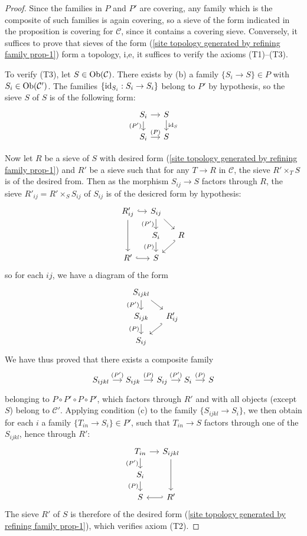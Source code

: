 \begin{proof}
Since the families in $P$ and $P'$ are covering, any family which is the composite of such families is again covering, so a sieve of the form indicated in the proposition is covering for $\mathcal{C}$, since it contains a covering sieve. Conversely, it suffices to prove that sieves of the form (\ref{site topology generated by refining family prop-1}) form a topology, i,e, it suffices to verify the axioms (T1)--(T3).\par
To verify (T3), let $S\in\mathrm{Ob}(\mathcal{C})$. There exists by (b) a family $\{S_i\to S\}\in P$ with $S_i\in\mathrm{Ob}(\mathcal{C}')$. The families $\{\operatorname{id}_{S_i}:S_i\to S_i\}$ belong to $P'$ by hypothesis, so the sieve $S$ of $S$ is of the following form:
\[\begin{tikzcd}[row sep=4mm, column sep=4mm]
S_i\ar[r]\ar[d,swap,"(P')"]&S\ar[d,"\id_S"]\\
S_i\ar[r,"(P)"]&S
\end{tikzcd}\]

Now let $R$ be a sieve of $S$ with desired form (\ref{site topology generated by refining family prop-1}) and $R'$ be a sieve such that for any $T\to R$ in $\mathcal{C}$, the sieve $R'\times_TS$ is of the desired from. Then as the morphism $S_{ij}\to S$ factors through $R$, the sieve $R'_{ij}=R'\times_SS_{ij}$ of $S_{ij}$ is of the desicred form by hypothesis:
\[\begin{tikzcd}[row sep=4mm, column sep=4mm]
R'_{ij}\ar[dd]\ar[r,hook]&S_{ij}\ar[d,swap,"(P')"]\ar[rd]&\\
&S_i\ar[d,swap,"(P)"]&R\ar[ld,hook']\\
R'\ar[r,hook]&S&
\end{tikzcd}\]
so for each $ij$, we have a diagram of the form
\[\begin{tikzcd}[row sep=4mm, column sep=4mm]
S_{ijkl}\ar[rd]\ar[d,swap,"(P')"]&\\
S_{ijk}\ar[d,swap,"(P)"]&R'_{ij}\ar[ld,hook']\\
S_{ij}
\end{tikzcd}\]
We have thus proved that there exists a composite family
\[\begin{tikzcd}[row sep=4mm, column sep=4mm]
S_{ijkl}\ar[r,"(P')"]&S_{ijk}\ar[r,"(P)"]&S_{ij}\ar[r,"(P')"]&S_i\ar[r,"(P)"]&S
\end{tikzcd}\]
belonging to $P\circ P'\circ P\circ P'$, which factors through $R'$ and with all objects (except $S$) belong to $\mathcal{C}'$. Applying condition (c) to the family $\{S_{ijkl}\to S_i\}$, we then obtain for each $i$ a family $\{T_{in}\to S_i\}\in P'$, such that $T_{in}\to S$ factors through one of the $S_{ijkl}$, hence through $R'$:
\[\begin{tikzcd}[row sep=4mm, column sep=4mm]
T_{in}\ar[r]\ar[d,swap,"(P')"]&S_{ijkl}\ar[dd]\\
S_i\ar[d,swap,"(P)"]&\\
S&R'\ar[l,hook']
\end{tikzcd}\]
The sieve $R'$ of $S$ is therefore of the desired form (\ref{site topology generated by refining family prop-1}), which verifies axiom (T2).\par


\end{proof}
